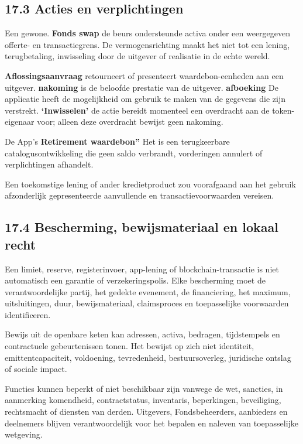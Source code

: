 \documentclass[11pt]{article}
\begin{document}
\subsection*{17.3 Acties en verplichtingen}

Een gewone. \textbf{Fonds swap} de beurs ondersteunde activa onder een weergegeven offerte- en transactiegrens. De vermogensrichting maakt het niet tot een lening, terugbetaling, inwisseling door de uitgever of realisatie in de echte wereld.

\textbf{Aflossingsaanvraag } retourneert of presenteert waardebon-eenheden aan een uitgever. \textbf{ nakoming } is de beloofde prestatie van de uitgever. \textbf{ afboeking } De applicatie heeft de mogelijkheid om gebruik te maken van de gegevens die zijn verstrekt. \textbf{`Inwisselen'} de actie bereidt momenteel een overdracht aan de token-eigenaar voor; alleen deze overdracht bewijst geen nakoming.

De App's \textbf{Retirement waardebon''} Het is een terugkeerbare catalogusontwikkeling die geen saldo verbrandt, vorderingen annulert of verplichtingen afhandelt.

Een toekomstige lening of ander kredietproduct zou voorafgaand aan het gebruik afzonderlijk gepresenteerde aanvullende en transactievoorwaarden vereisen.

\subsection*{17.4 Bescherming, bewijsmateriaal en lokaal recht}

Een limiet, reserve, registerinvoer, app-lening of blockchain-transactie is niet automatisch een garantie of verzekeringspolis. Elke bescherming moet de verantwoordelijke partij, het gedekte evenement, de financiering, het maximum, uitsluitingen, duur, bewijsmateriaal, claimsproces en toepasselijke voorwaarden identificeren.

Bewijs uit de openbare keten kan adressen, activa, bedragen, tijdstempels en contractuele gebeurtenissen tonen. Het bewijst op zich niet identiteit, emittentcapaciteit, voldoening, tevredenheid, bestuursoverleg, juridische ontslag of sociale impact.

Functies kunnen beperkt of niet beschikbaar zijn vanwege de wet, sancties, in aanmerking komendheid, contractstatus, inventaris, beperkingen, beveiliging, rechtsmacht of diensten van derden. Uitgevers, Fondsbeheerders, aanbieders en deelnemers blijven verantwoordelijk voor het bepalen en naleven van toepasselijke wetgeving.
\end{document}
